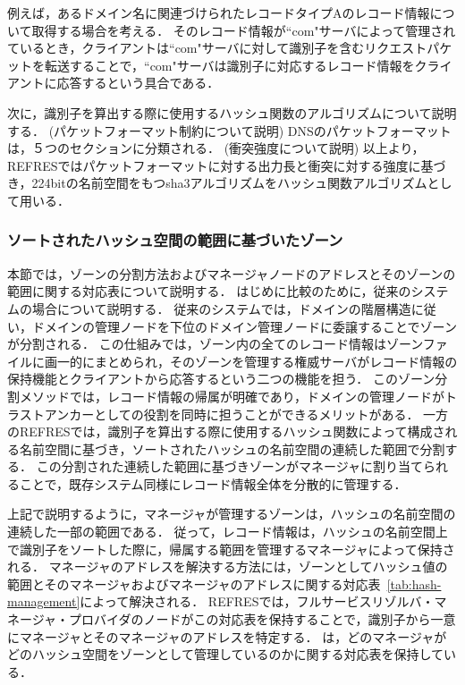 例えば，あるドメイン名に関連づけられたレコードタイプAのレコード情報について取得する場合を考える．
そのレコード情報が``com"サーバによって管理されているとき，クライアントは``com"サーバに対して識別子を含むリクエストパケットを転送することで，``com"サーバは識別子に対応するレコード情報をクライアントに応答するという具合である．

次に，識別子を算出する際に使用するハッシュ関数のアルゴリズムについて説明する．
(パケットフォーマット制約について説明)
DNSのパケットフォーマットは，５つのセクションに分類される．
(衝突強度について説明)
以上より，REFRESではパケットフォーマットに対する出力長と衝突に対する強度に基づき，224bitの名前空間をもつsha3アルゴリズムをハッシュ関数アルゴリズムとして用いる．


\subsubsection{ソートされたハッシュ空間の範囲に基づいたゾーン}
本節では，ゾーンの分割方法およびマネージャノードのアドレスとそのゾーンの範囲に関する対応表について説明する．
はじめに比較のために，従来のシステムの場合について説明する．
従来のシステムでは，ドメインの階層構造に従い，ドメインの管理ノードを下位のドメイン管理ノードに委譲することでゾーンが分割される．
この仕組みでは，ゾーン内の全てのレコード情報はゾーンファイルに画一的にまとめられ，そのゾーンを管理する権威サーバがレコード情報の保持機能とクライアントから応答するという二つの機能を担う．
このゾーン分割メソッドでは，レコード情報の帰属が明確であり，ドメインの管理ノードがトラストアンカーとしての役割を同時に担うことができるメリットがある．
一方のREFRESでは，識別子を算出する際に使用するハッシュ関数によって構成される名前空間に基づき，ソートされたハッシュの名前空間の連続した範囲で分割する．
この分割された連続した範囲に基づきゾーンがマネージャに割り当てられることで，既存システム同様にレコード情報全体を分散的に管理する．

上記で説明するように，マネージャが管理するゾーンは，ハッシュの名前空間の連続した一部の範囲である．
従って，レコード情報は，ハッシュの名前空間上で識別子をソートした際に，帰属する範囲を管理するマネージャによって保持される．
マネージャのアドレスを解決する方法には，ゾーンとしてハッシュ値の範囲とそのマネージャおよびマネージャのアドレスに関する対応表~\ref{tab:hash-management}によって解決される．
REFRESでは，フルサービスリゾルバ・マネージャ・プロバイダのノードがこの対応表を保持することで，識別子から一意にマネージャとそのマネージャのアドレスを特定する．
は，どのマネージャがどのハッシュ空間をゾーンとして管理しているのかに関する対応表を保持している．

